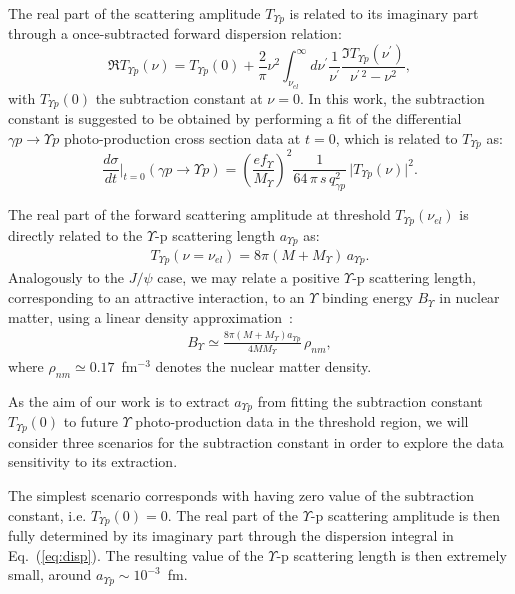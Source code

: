 \documentclass[prd,amsmath,%
twocolumn,floatfix,amssymb, preprintnumbers, linenumbers,nofootinbib, superscriptaddress]{revtex4}
\newcommand{\beq}{\begin{equation}}
\newcommand{\eeq}{\end{equation}}
\newcommand{\bea}{\begin{eqnarray}}
\newcommand{\eea}{\end{eqnarray}}
\begin{document}
The real part of the scattering amplitude $T_{\Upsilon p}$ is related to its imaginary part
through a once-subtracted forward dispersion relation:
\beq
\Re T_{\Upsilon p}(\nu) = T_{\Upsilon p}(0) + \frac{2}{\pi} \nu^2 \int_{\nu_{el}}^\infty d
\nu^\prime \frac{1}{\nu^\prime} \frac{\Im T_{\Upsilon p}(\nu^\prime)}{\nu^{\prime \, 2} - \nu^2},
\label{eq:disp}
\eeq
with $T_{\Upsilon p}(0) $ the subtraction constant at $\nu = 0$. In this work, the subtraction constant is suggested to be obtained by performing a fit of the 
differential $\gamma p \to \Upsilon p$  photo-production cross section data at $t=0$, which is related to $T_{\Upsilon p}$ as:
\beq
\frac{d \sigma}{dt} \biggr|_{t = 0} (\gamma p \to \Upsilon p) 
= \left( \frac{e f_\Upsilon}{M_\Upsilon} \right)^2  \frac{1}{64 \, \pi \, s \, q_{\gamma p}^2} \, \big| T_{\Upsilon p}(\nu) \big|^2.
\label{eq:dsigmadt0_gapjpsip}
\eeq

The real part of the forward scattering amplitude at threshold $T_{\Upsilon p}(\nu_{el}) $ is directly related to the $\Upsilon$-p scattering length 
$a_{\Upsilon p}$ as:
\bea
T_{\Upsilon p}(\nu = \nu_{el}) = 8 \pi (M + M_\Upsilon) \, a_{\Upsilon p}. 
\eea
Analogously to the $J/\psi$ case, 
we may relate a positive $\Upsilon$-p scattering length, corresponding to an attractive interaction, 
to an $\Upsilon$ binding energy $B_\Upsilon$ in nuclear matter, using a linear density approximation~\cite{Kaidalov:1992hd}:
\begin{eqnarray}
B_\Upsilon \simeq \frac{8 \pi (M + M_\Upsilon) a_{\Upsilon p}}{4 M M_\Upsilon} \, \rho_{nm},
\label{eq:nmbe}
\end{eqnarray}
where $\rho_{nm} \simeq 0.17$~fm$^{-3}$ denotes the nuclear matter density.

As the aim of our work is to extract $a_{\Upsilon p}$ from fitting the subtraction constant $T_{\Upsilon p}(0)$ to future $\Upsilon$ photo-production data in the threshold region, we will consider three scenarios for the subtraction constant in order to explore the data sensitivity to its extraction. 

The simplest scenario corresponds with having zero value of the subtraction constant, i.e. $T_{\Upsilon p}(0) = 0$. The real part of the $\Upsilon$-p  scattering amplitude is then fully determined by its imaginary part through the dispersion integral 
in Eq.~(\ref{eq:disp}). The resulting value of the $\Upsilon$-p scattering length is then extremely small, around $a_{\Upsilon p} \sim 10^{-3}$~fm. 
\end{document}
